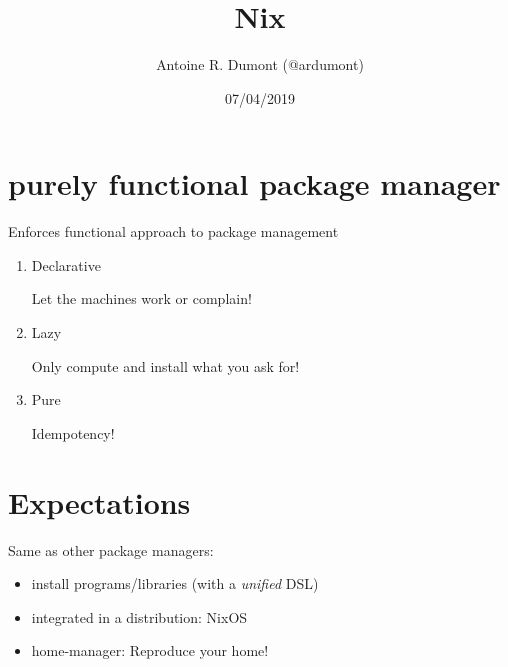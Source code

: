 \documentclass[smaller]{beamer}
\author{Antoine R. Dumont (@ardumont)}
\date{07/04/2019}
\title{Nix}
\begin{document}
\maketitle
\tableofcontents


\section{purely functional package manager}
\label{sec:org4bbf8c8}

Enforces functional approach to package management\\

\begin{enumerate}
\item Declarative
\label{sec:orgb1be189}

Let the machines work or complain!\\

\item Lazy
\label{sec:org49ef633}

Only compute and install what you ask for!\\

\item Pure
\label{sec:org286b4c8}

Idempotency!\\
\end{enumerate}

\section{Expectations}
\label{sec:orgf31d04b}

Same as other package managers:\\

\begin{itemize}
\item install programs/libraries (with a \emph{unified} DSL)\\

\item integrated in a distribution: NixOS\\

\item home-manager: Reproduce your home!\\
\end{itemize}
\end{document}
